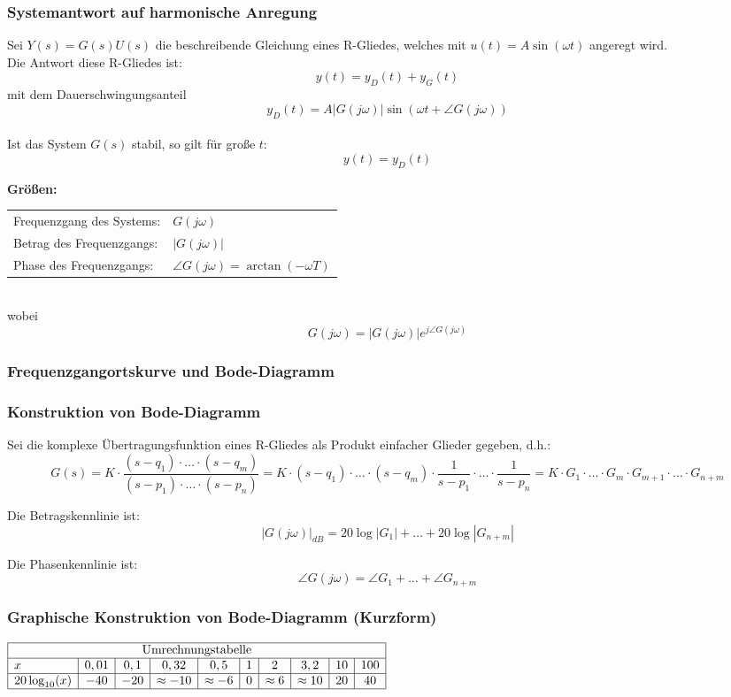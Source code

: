 \documentclass[10pt,a4paper]{article}
\begin{document}
\subsubsection{Systemantwort auf harmonische Anregung}
Sei $Y(s) = G(s)U(s)$ die beschreibende Gleichung eines R-Gliedes, welches mit $u(t) = A\sin(\omega t)$ angeregt wird. \\
Die Antwort diese R-Gliedes ist:
$$
	y(t) = y_D(t) + y_G(t)
$$
mit dem Dauerschwingungsanteil
$$
	y_D(t) = A|G(j\omega)| \sin(\omega t + \angle G(j \omega))
$$ \\

Ist das System $G(s)$ stabil, so gilt für große $t$:
$$
	y(t) = y_D(t)
$$

\textbf{Größen:} \\
\begin{tabular}{ll}
	Frequenzgang des Systems: & $G(j \omega)$ \\
	Betrag des Frequenzgangs: & $|G(j \omega)|$ \\
	Phase des Frequenzgangs: & $\angle G(j \omega) = \arctan(-\omega T)$
\end{tabular} \\

wobei
$$
	G(j \omega) = |G(j \omega)| e^{j \angle G(j \omega)}
$$

\subsubsection{Frequenzgangortskurve und Bode-Diagramm}
\subsubsection{Konstruktion von Bode-Diagramm}
Sei die komplexe Übertragungsfunktion eines R-Gliedes als Produkt einfacher Glieder gegeben, d.h.:
$$
	G(s) = K ⋅ \frac{(s-q_1) ⋅ \dots ⋅ (s - q_m)}{(s - p_1) ⋅ \dots ⋅ (s - p_n)} = K ⋅ (s - q_1) ⋅ \dots ⋅ (s - q_m) ⋅ \frac{1}{s - p_1} ⋅ \dots ⋅ \frac{1}{s - p_n} = K ⋅ G_1 ⋅ \dots ⋅ G_m ⋅ G_{m+1} ⋅ \dots ⋅ G_{n + m}
$$

Die Betragskennlinie ist:
$$
	|G(j \omega)|_{dB} = 20 \log |G_1| + \dots + 20 \log |G_{n + m}|
$$

Die Phasenkennlinie ist:
$$
	\angle G(j \omega) = \angle G_1 + \dots + \angle G_{n + m}
$$

\subsubsection{Graphische Konstruktion von Bode-Diagramm (Kurzform)}
\begin{center}
	$\begin{array}{|l|c|c|c|c|c|c|c|c|c|}
	\hline
	\multicolumn{10}{|c|}{\text{Umrechnungstabelle}} \\
	\hline
	x & 0,01 & 0,1 & 0,32 & 0,5 & 1 & 2 & 3,2 & 10 & 100 \\
	\hline
	20 \log_{10}(x) & -40 & -20 & \approx -10 & \approx -6 & 0 & \approx 6 & \approx 10 & 20 & 40 \\
	\hline
	\end{array}$
\end{center} ~\\
\end{document}
